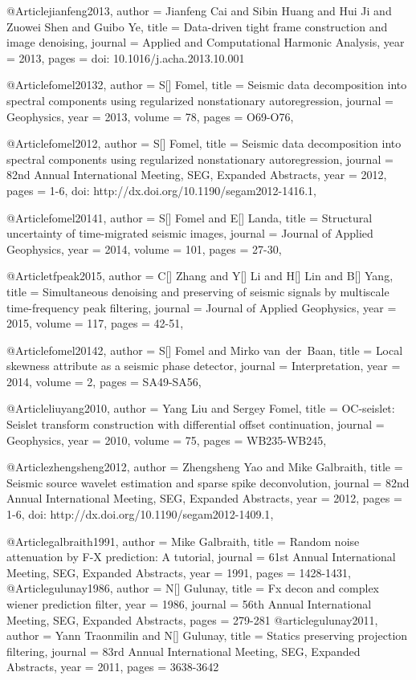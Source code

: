 @Article{jianfeng2013,
  author = 	 {Jianfeng Cai and Sibin Huang and Hui Ji and Zuowei Shen and Guibo Ye},
  title = 	 {Data-driven tight frame construction and image denoising},
  journal = 	 {Applied and Computational Harmonic Analysis},
  year = 	 2013,
  pages = 	 {doi: 10.1016/j.acha.2013.10.001}}

@Article{fomel20132,
  author = 	 {S[] Fomel},
  title = 	 {Seismic data decomposition into spectral components using regularized nonstationary autoregression},
  journal = 	 {Geophysics},
  year = 	 2013,
  volume =	 78,
  pages =	 {O69-O76},
}

@Article{fomel2012,
  author = 	 {S[] Fomel},
  title = 	 {Seismic data decomposition into spectral components using regularized nonstationary autoregression},
  journal = 	 {82nd Annual International Meeting, SEG, Expanded Abstracts},
  year = 	 2012,
  pages =	 {1-6, doi: http://dx.doi.org/10.1190/segam2012-1416.1},
}


@Article{fomel20141,
  author = 	 {S[] Fomel and E[] Landa},
  title = 	 {Structural uncertainty of time-migrated seismic images},
  journal = 	 {Journal of Applied Geophysics},
  year = 	 2014,
  volume =	 101,
  pages =	 {27-30},
}

@Article{tfpeak2015,
  author = 	 {C[] Zhang and Y[] Li and H[] Lin and B[] Yang},
  title = 	 {Simultaneous denoising and preserving of seismic signals by multiscale time-frequency peak filtering},
  journal = 	 {Journal of Applied Geophysics},
  year = 	 2015,
  volume =	 117,
  pages =	 {42-51},
}


@Article{fomel20142,
  author = 	 {S[] Fomel and Mirko van~der~Baan},
  title = 	 {Local skewness attribute as a seismic phase detector},
  journal = 	 {Interpretation},
  year = 	 2014,
  volume =	 2,
  pages =	 {SA49-SA56},
}

@Article{liuyang2010,
  author = 	 {Yang Liu and Sergey Fomel},
  title = 	 {OC-seislet: Seislet transform construction with differential offset continuation},
  journal = 	 {Geophysics},
  year = 	 2010,
  volume =	 75,
  pages =	 {WB235-WB245},
}

@Article{zhengsheng2012,
  author = 	 {Zhengsheng Yao and Mike Galbraith},
  title = 	 {Seismic source wavelet estimation and sparse spike deconvolution},
  journal = 	 {82nd Annual International Meeting, SEG, Expanded Abstracts},
  year = 	 2012,
  pages =	 {1-6, doi: http://dx.doi.org/10.1190/segam2012-1409.1},
}

@Article{galbraith1991,
  author = 	 {Mike Galbraith},
  title = 	 {Random noise attenuation by {F}-{X} prediction: A tutorial},
  journal = 	 {61st Annual International Meeting, SEG, Expanded Abstracts},
  year = 	 1991,
  pages =	 {1428-1431},
}
@Article{gulunay1986,
  author =	 {N[] Gulunay},
  title = 	 {Fx decon and complex wiener prediction filter},
  year = 	 {1986},
  journal = 	 {56th Annual International Meeting, SEG, Expanded Abstracts},  
  pages =        {279-281}
}
@article{gulunay2011,
  author =	 {Yann Traonmilin and N[] Gulunay},
  title = 	 {Statics preserving projection filtering},
  journal =    {83rd Annual International Meeting, SEG, Expanded Abstracts},
  year = 	 {2011},
  pages =        {3638-3642}
}

